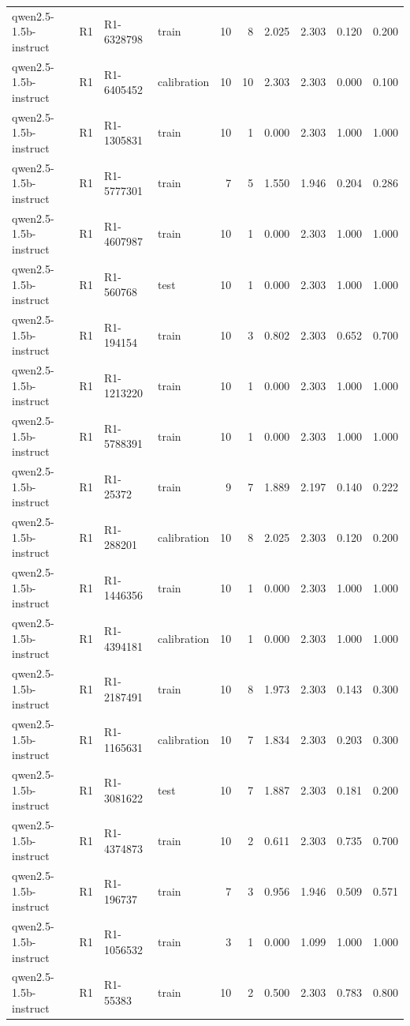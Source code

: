 \begin{table}
\begin{tabular}{llllrrrrrr}
qwen2.5-1.5b-instruct & R1 & R1-6328798 & train & 10 & 8 & 2.025 & 2.303 & 0.120 & 0.200 \\
qwen2.5-1.5b-instruct & R1 & R1-6405452 & calibration & 10 & 10 & 2.303 & 2.303 & 0.000 & 0.100 \\
qwen2.5-1.5b-instruct & R1 & R1-1305831 & train & 10 & 1 & 0.000 & 2.303 & 1.000 & 1.000 \\
qwen2.5-1.5b-instruct & R1 & R1-5777301 & train & 7 & 5 & 1.550 & 1.946 & 0.204 & 0.286 \\
qwen2.5-1.5b-instruct & R1 & R1-4607987 & train & 10 & 1 & 0.000 & 2.303 & 1.000 & 1.000 \\
qwen2.5-1.5b-instruct & R1 & R1-560768 & test & 10 & 1 & 0.000 & 2.303 & 1.000 & 1.000 \\
qwen2.5-1.5b-instruct & R1 & R1-194154 & train & 10 & 3 & 0.802 & 2.303 & 0.652 & 0.700 \\
qwen2.5-1.5b-instruct & R1 & R1-1213220 & train & 10 & 1 & 0.000 & 2.303 & 1.000 & 1.000 \\
qwen2.5-1.5b-instruct & R1 & R1-5788391 & train & 10 & 1 & 0.000 & 2.303 & 1.000 & 1.000 \\
qwen2.5-1.5b-instruct & R1 & R1-25372 & train & 9 & 7 & 1.889 & 2.197 & 0.140 & 0.222 \\
qwen2.5-1.5b-instruct & R1 & R1-288201 & calibration & 10 & 8 & 2.025 & 2.303 & 0.120 & 0.200 \\
qwen2.5-1.5b-instruct & R1 & R1-1446356 & train & 10 & 1 & 0.000 & 2.303 & 1.000 & 1.000 \\
qwen2.5-1.5b-instruct & R1 & R1-4394181 & calibration & 10 & 1 & 0.000 & 2.303 & 1.000 & 1.000 \\
qwen2.5-1.5b-instruct & R1 & R1-2187491 & train & 10 & 8 & 1.973 & 2.303 & 0.143 & 0.300 \\
qwen2.5-1.5b-instruct & R1 & R1-1165631 & calibration & 10 & 7 & 1.834 & 2.303 & 0.203 & 0.300 \\
qwen2.5-1.5b-instruct & R1 & R1-3081622 & test & 10 & 7 & 1.887 & 2.303 & 0.181 & 0.200 \\
qwen2.5-1.5b-instruct & R1 & R1-4374873 & train & 10 & 2 & 0.611 & 2.303 & 0.735 & 0.700 \\
qwen2.5-1.5b-instruct & R1 & R1-196737 & train & 7 & 3 & 0.956 & 1.946 & 0.509 & 0.571 \\
qwen2.5-1.5b-instruct & R1 & R1-1056532 & train & 3 & 1 & 0.000 & 1.099 & 1.000 & 1.000 \\
qwen2.5-1.5b-instruct & R1 & R1-55383 & train & 10 & 2 & 0.500 & 2.303 & 0.783 & 0.800 \\

\end{tabular}
\end{table}

